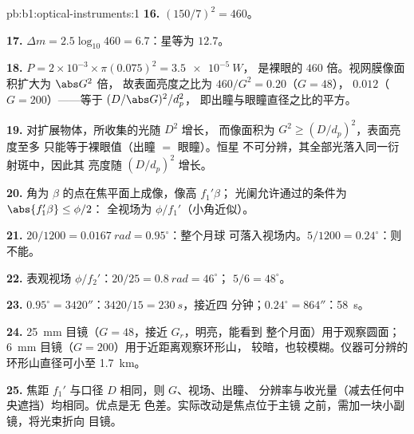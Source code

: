 \begin{solution}{pb:b1:optical-instruments:1}
\textbf{16.} $(150/7)^2 = 460$。

\textbf{17.} $\Delta m = 2.5\log_{10}460 = 6.7$：星等为 $12.7$。

\textbf{18.} $P = 2\times10^{-3} \times \pi(0.075)^2 = \qty{3.5e-5}{W}$，
是裸眼的 $460$ 倍。视网膜像面积扩大为 $\abs G^2$ 倍，
故表面亮度之比为 $460/G^2 = 0.20$（$G = 48$），
$0.012$（$G = 200$）——等于 $(D/\abs G)^2/d_p^2$，
即出瞳与眼瞳直径之比的平方。

\textbf{19.} 对扩展物体，所收集的光随 $D^2$ 增长，
而像面积为 $G^2 \geq (D/d_p)^2$，表面亮度至多
只能等于裸眼值（出瞳 $=$ 眼瞳）。恒星
不可分辨，其全部光落入同一衍射斑中，因此其
亮度随 $(D/d_p)^2$ 增长。

\textbf{20.} 角为 $\beta$ 的点在焦平面上成像，像高 $f_1'\beta$；
光阑允许通过的条件为 $\abs{f_1'\beta} \leq \phi/2$：
全视场为 $\phi/f_1'$（小角近似）。

\textbf{21.} $20/1200 = \qty{0.0167}{rad} = 0.95^\circ$：整个月球
可落入视场内。$5/1200 = 0.24^\circ$：则不能。

\textbf{22.} 表观视场 $\phi/f_2'$：$20/25 = \qty{0.8}{rad} = 46^\circ$；
$5/6 = 48^\circ$。

\textbf{23.} $0.95^\circ = 3420''$：$3420/15 = \qty{230}{s}$，接近四
分钟；$0.24^\circ = 864''$：\qty{58}{s}。

\textbf{24.} \qty{25}{mm} 目镜（$G = 48$，接近 $G_r$，明亮，能看到
整个月面）用于观察圆面；\qty{6}{mm} 目镜（$G = 200$）用于近距离观察环形山，
较暗，也较模糊。仪器可分辨的环形山直径可小至
\qty{1.7}{km}。

\textbf{25.} 焦距 $f_1'$ 与口径 $D$ 相同，则 $G$、视场、出瞳、
分辨率与收光量（减去任何中央遮挡）均相同。优点是无
色差。实际改动是焦点位于主镜
之前，需加一块小副镜，将光束折向
目镜。
\end{solution}
